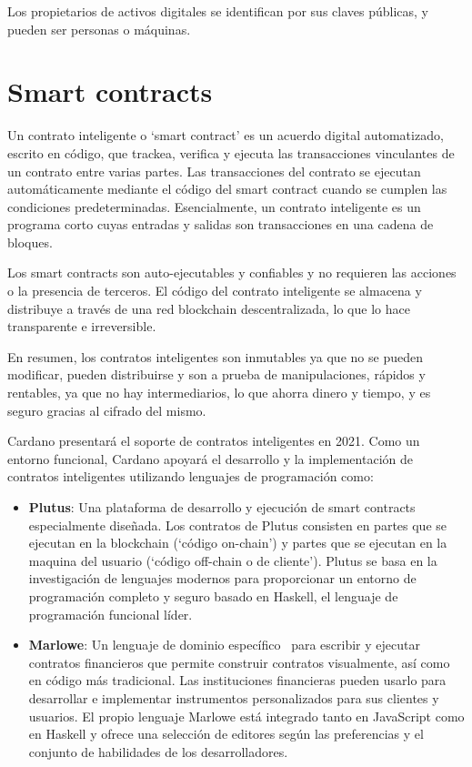\documentclass[12pt]{book}
\begin{document}
Los propietarios de activos digitales se identifican por sus claves públicas, y pueden ser personas o máquinas.

\section{Smart contracts}

Un contrato inteligente o `smart contract' es un acuerdo digital automatizado, escrito en código, que trackea, verifica y ejecuta las transacciones vinculantes de un contrato entre varias partes. Las transacciones del contrato se ejecutan automáticamente mediante el código del smart contract cuando se cumplen las condiciones predeterminadas. Esencialmente, un contrato inteligente es un programa corto cuyas entradas y salidas son transacciones en una cadena de bloques.

Los smart contracts son auto-ejecutables y confiables y no requieren las acciones o la presencia de terceros. El código del contrato inteligente se almacena y distribuye a través de una red blockchain descentralizada, lo que lo hace transparente e irreversible.

En resumen, los contratos inteligentes son inmutables ya que no se pueden modificar, pueden distribuirse y son a prueba de manipulaciones, rápidos y rentables, ya que no hay intermediarios, lo que ahorra dinero y tiempo, y es seguro gracias al cifrado del mismo.

Cardano presentará el soporte de contratos inteligentes en 2021. Como un entorno funcional, Cardano apoyará el desarrollo y la implementación de contratos inteligentes utilizando lenguajes de programación como:

\begin{itemize}
	\item \textbf{Plutus}: Una plataforma de desarrollo y ejecución de smart contracts especialmente diseñada.
	      Los contratos de Plutus consisten en partes que se ejecutan en la blockchain (`código on-chain') y partes que se ejecutan en la maquina del usuario (`código off-chain o de cliente').
	      Plutus se basa en la investigación de lenguajes modernos para proporcionar un entorno de programación completo y seguro basado en Haskell, el lenguaje de programación funcional líder.

	\item \textbf{Marlowe}: Un lenguaje de dominio específico~\cite{fowler2010dsl} para escribir y ejecutar contratos financieros que permite construir contratos visualmente, así como en código más tradicional. Las instituciones financieras pueden usarlo para desarrollar e implementar instrumentos personalizados para sus clientes y usuarios. El propio lenguaje Marlowe está integrado tanto en JavaScript como en Haskell y ofrece una selección de editores según las preferencias y el conjunto de habilidades de los desarrolladores.
\end{itemize}
\end{document}
